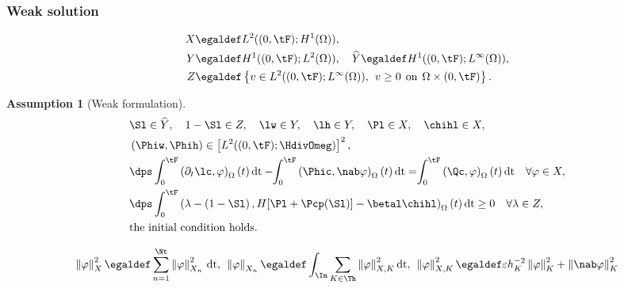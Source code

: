 \documentclass[10 pt]{beamer}
\newtheorem{assumption}[theorem]{Assumption}
\begin{document}

\begin{frame}
\frametitle{Weak solution}
\vspace{-0.7 cm}
\begin{align*}
X &\egaldef L^2((0,\tF);H^1(\Omega)),\\
Y & \egaldef H^1((0,\tF);L^2(\Omega)), \quad \widehat{Y} \egaldef H^1((0,\tF);L^{\infty}(\Omega)),\\ 
 Z & \egaldef \left\{v \in L^2((0,\tF);L^{\infty}(\Omega)), \hspace{0.15 cm} v \geq 0 \hspace{0.15 cm} \mbox{on} \hspace{0.15 cm} \Omega \times (0,\tF)  \right\}.
\end{align*}
\pause
\vspace{-0.3 cm}
\begin{assumption}[Weak formulation]
\label{ref:assumption:weak:solution}
\vspace{-0.8 cm}
\begin{align*}
&\Sl \in \widehat{Y}, \quad 1-\Sl \in Z, \quad \lw \in Y, \quad \lh \in Y, \quad \Pl \in X, \quad \chihl \in X,\\
&\left(\Phiw, \Phih\right) \in \left[L^2((0,\tF); \HdivOmeg)\right]^2 ,\\
&\dps \int_{0}^{\tF} \left(\partial_t \lc, \varphi \right)_{\Omega}(t)\,\mathrm{dt}-\hspace{-0.1 cm}\int_{0}^{\tF} \left(\Phic, \nab \varphi \right)_{\Omega}(t)\,\mathrm{dt} = \hspace{-0.1 cm} \int_{0}^{\tF} \left(\Qc, \varphi \right)_{\Omega}(t)\,\mathrm{dt} \quad \forall \varphi \in X, \\
&\dps \int_{0}^{\tF} \left(\lambda - \left(1 - \Sl\right), H[\Pl+\Pcp(\Sl)]-\betal \chihl  \right)_{\Omega}(t)\,\mathrm{dt} \geq 0 \quad \forall \lambda \in Z, \\
&\nonumber\mbox{the initial condition  holds}.
\end{align*}
\end{assumption}
\pause
\vspace*{-0.4 cm}
\begin{equation*}
\left\| \varphi \right\|_X^2 \egaldef \sum_{n=1}^{\Nt}\left\|\varphi \right\|_{X_n}^2\,\mathrm{dt}, 
\hspace{0.15 cm} \left\| \varphi \right\|_{X_n} \egaldef \int_{\In} \sum_{K \in \Th} \left\| \varphi \right\|_{X,K}^2 \mathrm{dt}, \hspace{0.15 cm} \left\| \varphi \right\|_{X,K}^2 \egaldef \varepsilon h_K^{-2} \left\|\varphi\right\|_K^2 + \left\|\nab \varphi\right\|_K^2
\end{equation*}

\end{frame}
\end{document}
